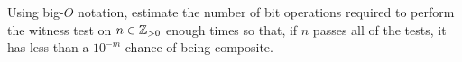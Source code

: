 \begin{problem}
  Using big-$O$ notation, estimate the number of bit operations
  required to perform the witness test on $n \in \mathbb{Z}_{>0}$ enough times
  so that, if $n$ passes all of the tests, it has less than a
  $10^{-m}$ chance of being composite.
\end{problem}

\begin{Answer}
  
\end{Answer}
